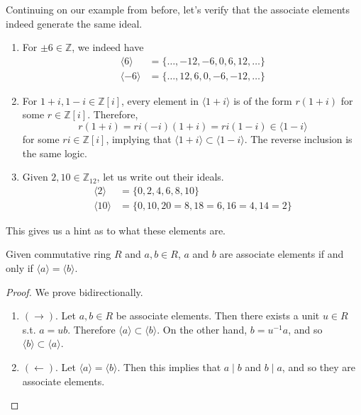   \begin{example}
    Continuing on our example from before, let's verify that the associate elements indeed generate the same ideal. 
    \begin{enumerate}
      \item For $\pm 6 \in \mathbb{Z}$, we indeed have 
        \begin{align}
          \langle 6 \rangle & = \{ \ldots, -12, -6, 0, 6, 12, \ldots \} \\
          \langle -6 \rangle & = \{ \ldots, 12, 6, 0, -6, -12, \ldots \} 
        \end{align}

      \item For $1 + i, 1 - i \in \mathbb{Z}[i]$, every element in $\langle 1 + i \rangle$ is of the form $r (1 + i)$ for some $r \in \mathbb{Z}[i]$. Therefore, 
        \begin{equation}
          r(1 + i) = ri (-i)(1 + i) = ri (1 - i) \in \langle 1 - i \rangle
        \end{equation}
        for some $ri \in \mathbb{Z}[i]$, implying that $\langle 1 + i \rangle \subset \langle 1 - i \rangle$. The reverse inclusion is the same logic. 

      \item Given $2, 10 \in \mathbb{Z}_{12}$, let us write out their ideals. 
        \begin{align}
          \langle 2 \rangle & = \{0, 2, 4, 6, 8, 10\} \\ 
          \langle 10 \rangle & = \{0, 10, 20 = 8, 18 = 6, 16 = 4, 14 = 2\}
        \end{align}
    \end{enumerate}
  \end{example} 

  This gives us a hint as to what these elements are. 

  \begin{theorem}
    Given commutative ring $R$ and $a, b \in R$, $a$ and $b$ are associate elements if and only if $\langle a \rangle = \langle b \rangle$. 
  \end{theorem}
  \begin{proof}
    We prove bidirectionally. 
    \begin{enumerate}
      \item $(\rightarrow)$. Let $a, b \in R$ be associate elements. Then there exists a unit $u \in R$ s.t. $a = ub$. Therefore $ \langle a \rangle \subset \langle b \rangle$. On the other hand, $b = u^{-1} a$, and so $\langle b \rangle \subset \langle a \rangle$. 
      \item $(\leftarrow)$. Let $\langle a \rangle = \langle b \rangle$. Then this implies that $a \mid b$ and $b \mid a$, and so they are associate elements. 
    \end{enumerate}
  \end{proof}

